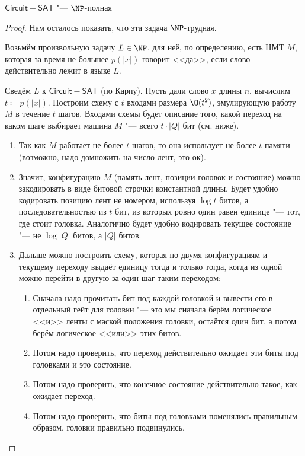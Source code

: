 	\begin{theorem}
		$\mathsf{Circuit-SAT}$ "--- $\NP$-полная
	\end{theorem}
	\begin{proof}
		Нам осталось показать, что эта задача $\NP$-трудная.

		Возьмём произвольную задачу $L \in \NP$, для неё, по определению, есть НМТ $M$, которая за время не большее $p(|x|)$ говорит <<да>>,
		если слово действительно лежит в языке $L$.

		Сведём $L$ к $\mathsf{Circuit-SAT}$ (по Карпу).
		Пусть дали слово $x$ длины $n$, вычислим $t \coloneq p(|x|)$.
		Построим схему с $t$ входами размера $\O(t^2)$, эмулирующую работу $M$ в течение $t$ шагов.
		Входами схемы будет описание того, какой переход на каком шаге выбирает машина $M$ "--- всего $t \cdot |Q|$ бит (см. ниже).
		\begin{enumerate}
			\item
				Так как $M$ работает не более $t$ шагов, то она использует не более $t$ памяти (возможно, надо домножить на число лент, это ок).
			\item
				Значит, конфигурацию $M$ (память лент, позиции головок и состояние) можно закодировать в виде битовой строчки константной длины.
				Будет удобно кодировать позицию лент не номером, используя $\log t$ битов, а последовательностью из $t$ бит, из которых ровно один равен единице "--- тот, где стоит головка.
				Аналогично будет удобно кодировать текущее состояние "--- не $\log |Q|$ битов, а $|Q|$ битов.
			\item
				Дальше можно построить схему, которая по двумя конфигурациям и текущему переходу выдаёт единицу тогда и только тогда, когда из одной можно перейти в другую за один шаг таким переходом:
				\begin{enumerate}
					\item
						Сначала надо прочитать бит под каждой головкой и вывести его в отдельный гейт для головки "--- это мы сначала берём логическое <<и>> ленты с маской положения головки,
						остаётся один бит, а потом берём логическое <<или>> этих битов.
					\item
						Потом надо проверить, что переход действительно ожидает эти биты под головками и это состояние.
					\item
						Потом надо проверить, что конечное состояние действительно такое, как ожидает переход.
					\item
						Потом надо проверить, что биты под головками поменялись правильным образом, головки правильно подвинулись.

\end{enumerate}
\end{enumerate}
\end{proof}

